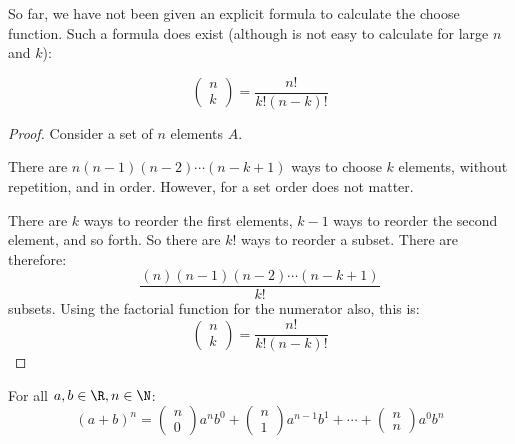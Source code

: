 \documentclass[../Main.tex]{subfiles}
\begin{document}
So far, we have not been given an explicit formula to calculate the choose function. Such a formula does exist (although is not easy to calculate for large $n$ and $k$):
\begin{proposition}
    \begin{equation*}
        \begin{pmatrix}n \\ k\end{pmatrix} = \frac{n!}{k!(n-k)!}
    \end{equation*}
    \label{propChooseFunc}
\end{proposition}
\begin{proof}
    Consider a set of $n$ elements $A$.\par
    There are $n(n-1)(n-2) \cdots (n-k+1)$ ways to choose $k$ elements, without repetition, and in order. However, for a set order does not matter.\par
    There are $k$ ways to reorder the first elements, $k - 1$ ways to reorder the second element, and so forth. So there are $k!$ ways to reorder a subset. There are therefore:
    \begin{equation*}
        \frac{(n)(n-1)(n-2) \cdots (n-k+1)}{k!}
    \end{equation*}
    subsets. Using the factorial function for the numerator also, this is:
    \begin{equation*}
        \begin{pmatrix}n \\ k\end{pmatrix} = \frac{n!}{k!(n-k)!}
    \end{equation*}
\end{proof}
\begin{theorem}
    For all $a, b \in \R, n \in \N$:
    \begin{equation*}
        (a + b)^n = \begin{pmatrix}n \\ 0\end{pmatrix}a^n b^0 + \begin{pmatrix}n \\ 1\end{pmatrix}a^{n-1} b^1 + \cdots + \begin{pmatrix}n \\ n\end{pmatrix} a^0 b^n
    \end{equation*}
    \label{thmBinomial}
\end{theorem}
\end{document}

